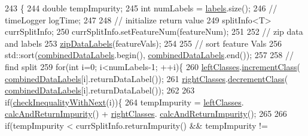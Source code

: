 \begin{DoxyCode}
243                                                                                        \{
244                     \textcolor{keywordtype}{double} tempImpurity;
245                     \textcolor{keywordtype}{int} numLabels = \hyperlink{classfp_1_1split_a9658b163c2cd30e9900e21c3b1c3f2f9}{labels}.size();
246                 \textcolor{comment}{//  timeLogger logTime;}
247 
248                     \textcolor{comment}{// initialize return value}
249                     splitInfo<T> currSplitInfo;
250                     currSplitInfo.setFeatureNum(featureNum);
251 
252                     \textcolor{comment}{// zip data and labels}
253                     \hyperlink{classfp_1_1split_a8fc67880c45fe8a9f7ab8d0cc860597f}{zipDataLabels}(featureVals);
254 
255                     \textcolor{comment}{// sort feature Vals}
256                     std::sort(\hyperlink{classfp_1_1split_ac8f54cf4a42335814e10e351c49e3c32}{combinedDataLabels}.begin(), 
      \hyperlink{classfp_1_1split_ac8f54cf4a42335814e10e351c49e3c32}{combinedDataLabels}.end());
257 
258                     \textcolor{comment}{// find split}
259                     \textcolor{keywordflow}{for}(\textcolor{keywordtype}{int} i=0; i<numLabels-1; ++i)\{
260                         \hyperlink{classfp_1_1split_a3be6dcf32281715e6376e9f5f8da18f0}{leftClasses}.\hyperlink{classfp_1_1classTotals_aa05c13b36638adc361d638559c43a447}{incrementClass}(
      \hyperlink{classfp_1_1split_ac8f54cf4a42335814e10e351c49e3c32}{combinedDataLabels}[i].returnDataLabel());
261                         \hyperlink{classfp_1_1split_af5366297f7de9b8ff0911186300bab7e}{rightClasses}.\hyperlink{classfp_1_1classTotals_af388dc1e664488603f7834da2f097a06}{decrementClass}(
      \hyperlink{classfp_1_1split_ac8f54cf4a42335814e10e351c49e3c32}{combinedDataLabels}[i].returnDataLabel());
262 
263                         \textcolor{keywordflow}{if}(\hyperlink{classfp_1_1split_ac75c6034210f3c53ff3435e2d12377e1}{checkInequalityWithNext}(i))\{
264                             tempImpurity = \hyperlink{classfp_1_1split_a3be6dcf32281715e6376e9f5f8da18f0}{leftClasses}.
      \hyperlink{classfp_1_1classTotals_a94eaf5d719442de6f7014b0630932bb8}{calcAndReturnImpurity}() + \hyperlink{classfp_1_1split_af5366297f7de9b8ff0911186300bab7e}{rightClasses}.
      \hyperlink{classfp_1_1classTotals_a94eaf5d719442de6f7014b0630932bb8}{calcAndReturnImpurity}();
265                             
266                             \textcolor{keywordflow}{if}(tempImpurity < currSplitInfo.returnImpurity() && tempImpurity != 

\end{DoxyCode}

